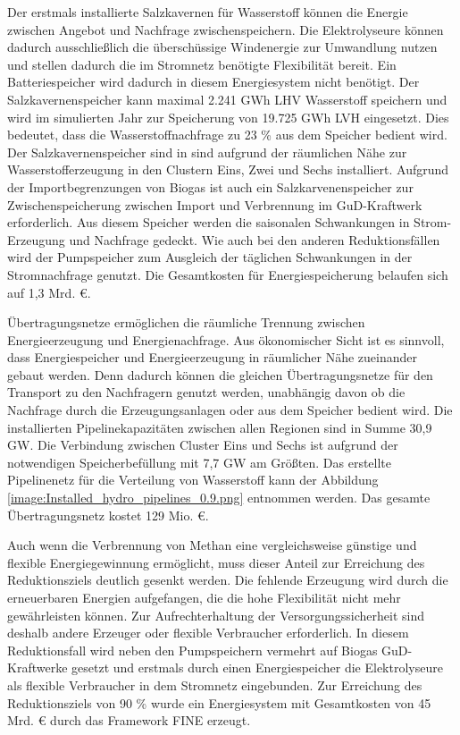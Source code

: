 Der erstmals installierte Salzkavernen für Wasserstoff können die Energie zwischen Angebot und Nachfrage zwischenspeichern. Die Elektrolyseure können dadurch ausschließlich die überschüssige Windenergie zur Umwandlung nutzen und stellen dadurch die im Stromnetz benötigte Flexibilität bereit. Ein Batteriespeicher wird dadurch in diesem Energiesystem nicht benötigt.
Der Salzkavernenspeicher kann maximal 2.241 GWh LHV Wasserstoff speichern und wird im simulierten Jahr zur Speicherung von 19.725 GWh LVH eingesetzt. Dies bedeutet, dass die Wasserstoffnachfrage zu 23 \% aus dem Speicher bedient wird. Der Salzkavernenspeicher sind in sind aufgrund der räumlichen Nähe zur Wasserstofferzeugung in den Clustern Eins, Zwei und Sechs installiert.
Aufgrund der Importbegrenzungen von Biogas ist auch ein Salzkarvenenspeicher zur Zwischenspeicherung zwischen Import und Verbrennung im GuD-Kraftwerk erforderlich. Aus diesem Speicher werden die saisonalen Schwankungen in Strom-Erzeugung und Nachfrage gedeckt.
Wie auch bei den anderen Reduktionsfällen wird der Pumpspeicher zum Ausgleich der täglichen Schwankungen in der Stromnachfrage genutzt. 
Die Gesamtkosten für Energiespeicherung belaufen sich auf 1,3 Mrd. €.


Übertragungsnetze ermöglichen die räumliche Trennung zwischen Energieerzeugung und Energienachfrage. 
Aus ökonomischer Sicht ist es sinnvoll, dass Energiespeicher und Energieerzeugung in räumlicher Nähe zueinander gebaut werden. Denn dadurch können die gleichen Übertragungsnetze für den Transport zu den Nachfragern genutzt werden, unabhängig davon ob die Nachfrage durch die Erzeugungsanlagen oder aus dem Speicher bedient wird. 
Die installierten Pipelinekapazitäten zwischen allen Regionen sind in Summe 30,9 GW. Die Verbindung zwischen Cluster Eins und Sechs ist aufgrund der notwendigen Speicherbefüllung mit 7,7 GW am Größten.
Das erstellte Pipelinenetz für die Verteilung von Wasserstoff kann der Abbildung \ref{image:Installed_hydro_pipelines_0.9.png} entnommen werden. Das gesamte Übertragungsnetz kostet 129 Mio. €.

Auch wenn die Verbrennung von Methan eine vergleichsweise günstige und flexible Energiegewinnung ermöglicht, muss dieser Anteil zur Erreichung des Reduktionsziels deutlich gesenkt werden. Die fehlende Erzeugung wird durch die erneuerbaren Energien aufgefangen, die die hohe Flexibilität nicht mehr gewährleisten können. Zur Aufrechterhaltung der Versorgungssicherheit sind deshalb andere Erzeuger oder flexible Verbraucher erforderlich. In diesem Reduktionsfall wird neben den Pumpspeichern vermehrt auf Biogas GuD-Kraftwerke gesetzt und erstmals durch einen Energiespeicher die Elektrolyseure als flexible Verbraucher in dem Stromnetz eingebunden.
Zur Erreichung des Reduktionsziels von 90 \% wurde ein Energiesystem mit Gesamtkosten von 45 Mrd. € durch das Framework FINE erzeugt.


